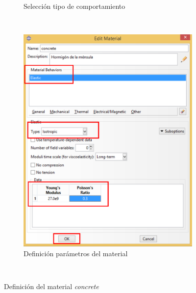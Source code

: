 \begin{enumerate}
\begin{figure}[H]
\begin{subfigure}{0.39\textwidth}
    \caption{Selección tipo de comportamiento}
    \label{figu14}
  \end{subfigure}
  ~ %
  \begin{subfigure}{0.39\textwidth}
    \includegraphics[width=\textwidth]{./body/images/imagen15.pdf}
    \caption{Definición parámetros del material}
    \label{figu15}
  \end{subfigure}
  ~ %
  \caption{Definición del material \textit{concrete}}
\end{figure}


\end{enumerate}
